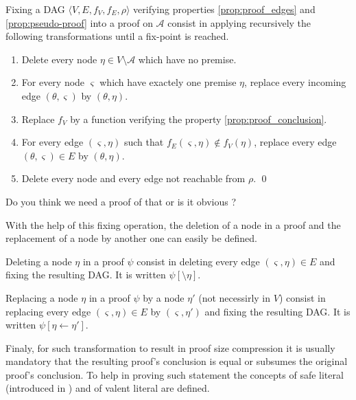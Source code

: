\documentclass{llncs}
\newenvironment{jogo}{\color{teal}}{}
\begin{document}
\begin{definition}[Fixing]
Fixing a DAG $\langle V, E, f_V, f_E, \rho \rangle$ verifying properties \ref{prop:proof_edges} and
\ref{prop:pseudo-proof} into a proof on $\mathcal{A}$ consist in applying recursively the following
transformations until a fix-point is reached.
\begin{enumerate}
  \item Delete every node $\eta \in V \setminus \mathcal{A}$ which have no premise.
  \item For every node $\varsigma$ which have exactely one premise $\eta$, replace every incoming
    edge $(\theta,\varsigma)$ by $(\theta,\eta)$.
  \item Replace $f_V$ by a function verifying the property \ref{prop:proof_conclusion}.
  \item For every edge $(\varsigma,\eta)$ such that $f_E(\varsigma,\eta) \notin f_V(\eta)$, replace
    every edge $(\theta,\varsigma) \in E$ by $(\theta,\eta)$.
  \item Delete every node and every edge not reachable from $\rho$.
  \qed
\end{enumerate}
\end{definition}

\begin{jogo}
Do you think we need a proof of that or is it obvious ?
\end{jogo}

With the help of this fixing operation, the deletion of a node in a proof and the replacement of a
node by another one can easily be defined.

\begin{definition}
Deleting a node $\eta$ in a proof $\psi$ consist in deleting every edge $(\varsigma,\eta) \in E$ and
fixing the resulting DAG. It is written $\psi[\setminus \eta]$.
\end{definition}

\begin{definition}
Replacing a node $\eta$ in a proof $\psi$ by a node $\eta'$ (not necessirly in $V$) consist in
replacing every edge $(\varsigma,\eta) \in E$ by $(\varsigma,\eta')$ and fixing the resulting DAG.
It is written $\psi[\eta \leftarrow \eta']$.
\end{definition}

Finaly, for such transformation to result in proof size compression it is usually mandatory that the
resulting proof's conclusion is equal or subsumes the original proof's conclusion. To help in
proving such statement the concepts of safe literal (introduced in \cite{RPILU}) and of valent
literal are defined.
\end{document}
